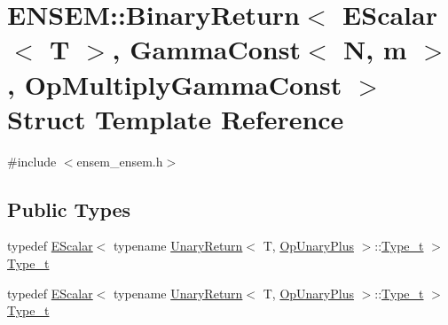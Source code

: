 \hypertarget{structENSEM_1_1BinaryReturn_3_01EScalar_3_01T_01_4_00_01GammaConst_3_01N_00_01m_01_4_00_01OpMultiplyGammaConst_01_4}{}\section{E\+N\+S\+EM\+:\+:Binary\+Return$<$ E\+Scalar$<$ T $>$, Gamma\+Const$<$ N, m $>$, Op\+Multiply\+Gamma\+Const $>$ Struct Template Reference}
\label{structENSEM_1_1BinaryReturn_3_01EScalar_3_01T_01_4_00_01GammaConst_3_01N_00_01m_01_4_00_01OpMultiplyGammaConst_01_4}


{\ttfamily \#include $<$ensem\+\_\+ensem.\+h$>$}

\subsection*{Public Types}
\begin{DoxyCompactItemize}
\item 
typedef \mbox{\hyperlink{classENSEM_1_1EScalar}{E\+Scalar}}$<$ typename \mbox{\hyperlink{structENSEM_1_1UnaryReturn}{Unary\+Return}}$<$ T, \mbox{\hyperlink{structENSEM_1_1OpUnaryPlus}{Op\+Unary\+Plus}} $>$\+::\mbox{\hyperlink{structENSEM_1_1BinaryReturn_3_01EScalar_3_01T_01_4_00_01GammaConst_3_01N_00_01m_01_4_00_01OpMultiplyGammaConst_01_4_a32c24d4ee935ad275ff272dc1c66dc9e}{Type\+\_\+t}} $>$ \mbox{\hyperlink{structENSEM_1_1BinaryReturn_3_01EScalar_3_01T_01_4_00_01GammaConst_3_01N_00_01m_01_4_00_01OpMultiplyGammaConst_01_4_a32c24d4ee935ad275ff272dc1c66dc9e}{Type\+\_\+t}}
\item 
typedef \mbox{\hyperlink{classENSEM_1_1EScalar}{E\+Scalar}}$<$ typename \mbox{\hyperlink{structENSEM_1_1UnaryReturn}{Unary\+Return}}$<$ T, \mbox{\hyperlink{structENSEM_1_1OpUnaryPlus}{Op\+Unary\+Plus}} $>$\+::\mbox{\hyperlink{structENSEM_1_1BinaryReturn_3_01EScalar_3_01T_01_4_00_01GammaConst_3_01N_00_01m_01_4_00_01OpMultiplyGammaConst_01_4_a32c24d4ee935ad275ff272dc1c66dc9e}{Type\+\_\+t}} $>$ \mbox{\hyperlink{structENSEM_1_1BinaryReturn_3_01EScalar_3_01T_01_4_00_01GammaConst_3_01N_00_01m_01_4_00_01OpMultiplyGammaConst_01_4_a32c24d4ee935ad275ff272dc1c66dc9e}{Type\+\_\+t}}
\end{DoxyCompactItemize}



